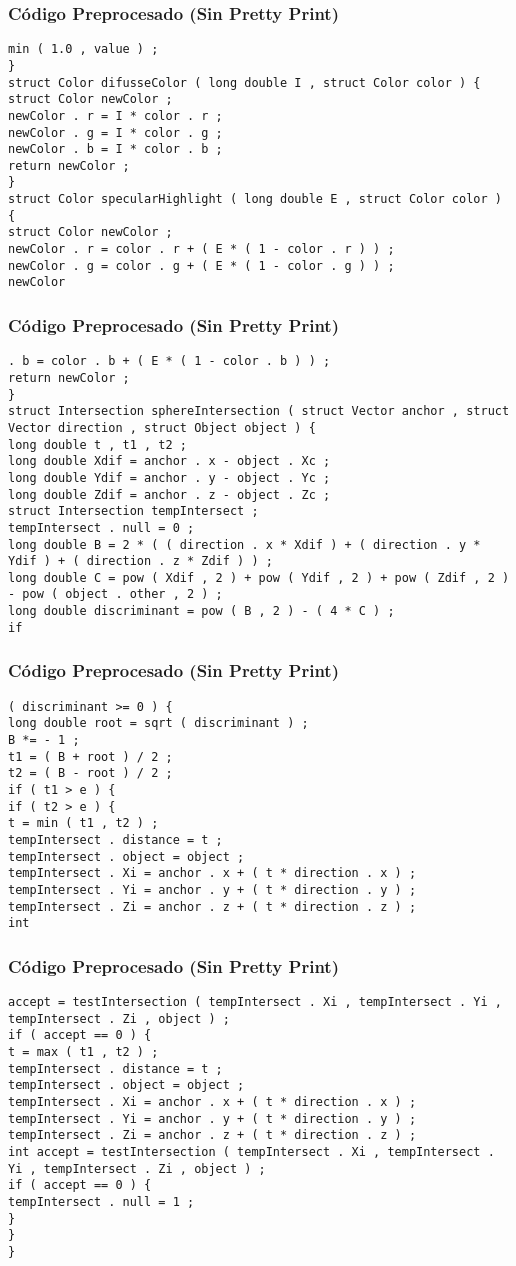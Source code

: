 \documentclass{beamer}
\begin{document}
\begin{frame}[fragile]
\frametitle{C\'odigo Preprocesado (Sin Pretty Print)}
\begin{lstlisting}[style=CStyle]
min ( 1.0 , value ) ; 
} 
struct Color difusseColor ( long double I , struct Color color ) { 
struct Color newColor ; 
newColor . r = I * color . r ; 
newColor . g = I * color . g ; 
newColor . b = I * color . b ; 
return newColor ; 
} 
struct Color specularHighlight ( long double E , struct Color color ) { 
struct Color newColor ; 
newColor . r = color . r + ( E * ( 1 - color . r ) ) ; 
newColor . g = color . g + ( E * ( 1 - color . g ) ) ; 
newColor \end{lstlisting}
\end{frame}
\begin{frame}[fragile]
\frametitle{C\'odigo Preprocesado (Sin Pretty Print)}
\begin{lstlisting}[style=CStyle]
. b = color . b + ( E * ( 1 - color . b ) ) ; 
return newColor ; 
} 
struct Intersection sphereIntersection ( struct Vector anchor , struct Vector direction , struct Object object ) { 
long double t , t1 , t2 ; 
long double Xdif = anchor . x - object . Xc ; 
long double Ydif = anchor . y - object . Yc ; 
long double Zdif = anchor . z - object . Zc ; 
struct Intersection tempIntersect ; 
tempIntersect . null = 0 ; 
long double B = 2 * ( ( direction . x * Xdif ) + ( direction . y * Ydif ) + ( direction . z * Zdif ) ) ; 
long double C = pow ( Xdif , 2 ) + pow ( Ydif , 2 ) + pow ( Zdif , 2 ) - pow ( object . other , 2 ) ; 
long double discriminant = pow ( B , 2 ) - ( 4 * C ) ; 
if \end{lstlisting}
\end{frame}
\begin{frame}[fragile]
\frametitle{C\'odigo Preprocesado (Sin Pretty Print)}
\begin{lstlisting}[style=CStyle]
( discriminant >= 0 ) { 
long double root = sqrt ( discriminant ) ; 
B *= - 1 ; 
t1 = ( B + root ) / 2 ; 
t2 = ( B - root ) / 2 ; 
if ( t1 > e ) { 
if ( t2 > e ) { 
t = min ( t1 , t2 ) ; 
tempIntersect . distance = t ; 
tempIntersect . object = object ; 
tempIntersect . Xi = anchor . x + ( t * direction . x ) ; 
tempIntersect . Yi = anchor . y + ( t * direction . y ) ; 
tempIntersect . Zi = anchor . z + ( t * direction . z ) ; 
int \end{lstlisting}
\end{frame}
\begin{frame}[fragile]
\frametitle{C\'odigo Preprocesado (Sin Pretty Print)}
\begin{lstlisting}[style=CStyle]
accept = testIntersection ( tempIntersect . Xi , tempIntersect . Yi , tempIntersect . Zi , object ) ; 
if ( accept == 0 ) { 
t = max ( t1 , t2 ) ; 
tempIntersect . distance = t ; 
tempIntersect . object = object ; 
tempIntersect . Xi = anchor . x + ( t * direction . x ) ; 
tempIntersect . Yi = anchor . y + ( t * direction . y ) ; 
tempIntersect . Zi = anchor . z + ( t * direction . z ) ; 
int accept = testIntersection ( tempIntersect . Xi , tempIntersect . Yi , tempIntersect . Zi , object ) ; 
if ( accept == 0 ) { 
tempIntersect . null = 1 ; 
} 
} 
} \end{lstlisting}
\end{frame}
\end{document}
